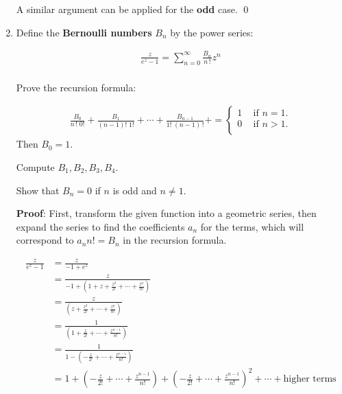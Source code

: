 \begin{enumerate}
    A similar argument can be applied for the \textbf{odd} case.
    \qed
  
    \item Define the \textbf{Bernoulli numbers} $B_n$ by the power series:
  
    \begin{align*}
      \frac{z}{e^z - 1} = \sum_{n = 0}^{\infty}\frac{B_n}{n\,!}z^n \\
    \end{align*}
  
    Prove the recursion formula:
  
    \begin{align*}
      \frac{B_0}{n \, ! \; 0!} + \frac{B_1}{(n - 1)! \; 1!} + \cdots + \frac{B_{n - 1}}{1! \; (n - 1)\,!} + = 
      \begin{cases}
        1 \;\;\; \text{   if } n = 1. \\
        0 \;\;\; \text{   if } n > 1. \\
      \end{cases}
    \end{align*}
    Then $B_0 = 1.$
    
    Compute $B_1, B_2, B_3, B_4.$
    
    Show that $B_n = 0$ if $n$ is odd and $n \not = 1.$

    \textbf{Proof}:
    First, transform the given function into a geometric series, then expand the series to find the coefficients
    $a_n$ for the terms, which will correspond to $a_n n! = B_n$ in the recursion formula. 

    \begin{align*}
      \frac{z}{e^z - 1} &= \frac{z}{-1 + e^z} \\
      &= \frac{z}{-1 + \left(1 + z + \frac{z^2}{2!} + \cdots + \frac{z^n}{n!} \right)} \\
      &= \frac{z}{\left(z + \frac{z^2}{2!} + \cdots + \frac{z^n}{n!} \right)} \\
      &= \frac{1}{\left(1 + \frac{z}{2!} + \cdots + \frac{z^{n - 1}}{n!} \right)} \\
      &= \frac{1}{1 - \left( - \frac{z}{2!} + \cdots + \frac{z^{n - 1}}{n!} \right)} \\
      &= 1 + \left( - \frac{z}{2!} + \cdots + \frac{z^{n - 1}}{n!} \right) + \left( - \frac{z}{2!} + 
      \cdots + \frac{z^{n - 1}}{n!} \right)^2 + \cdots + \text{higher terms} \\
    \end{align*}
    

\end{enumerate}
